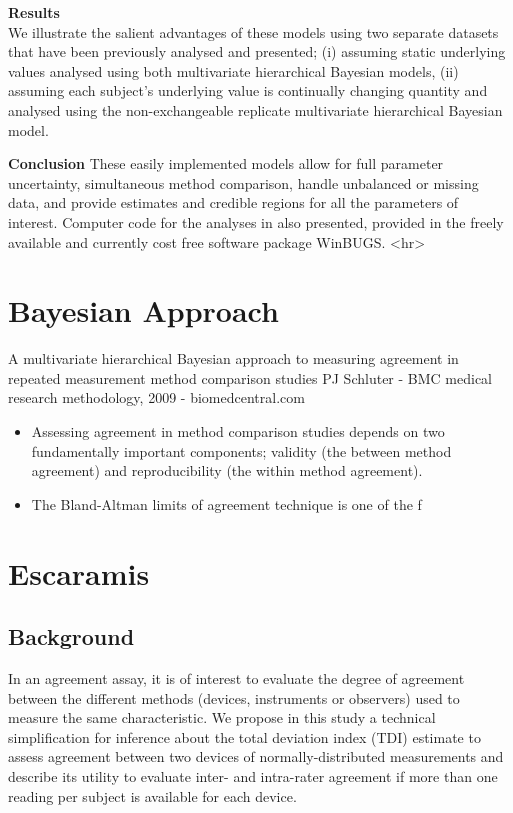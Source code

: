 \documentclass[12pt, a4paper]{report}
\theoremstyle{plain}
\theoremstyle{definition}
\theoremstyle{remark}
\begin{document}
\textbf{Results}\\
We illustrate the salient advantages of these models using two separate datasets that have been previously analysed and presented; 
(i) assuming static underlying values analysed using both multivariate hierarchical Bayesian models,  
(ii) assuming each subject's underlying value is continually changing quantity and analysed using the non-exchangeable replicate multivariate hierarchical Bayesian model.  

\textbf{Conclusion}
These easily implemented models allow for full parameter uncertainty, simultaneous method comparison, handle unbalanced or missing data, and provide estimates and credible regions for all the parameters of interest. Computer code for the analyses in also presented, provided in the freely available and currently cost free software package WinBUGS.
<hr>

\section*{Bayesian Approach}
A multivariate hierarchical Bayesian approach to measuring agreement in repeated measurement method comparison studies
PJ Schluter - BMC medical research methodology, 2009 - biomedcentral.com

\begin{itemize}
	\item Assessing agreement in method comparison studies depends on two fundamentally important 
	components; validity (the between method agreement) and reproducibility (the within method 
	agreement). 
	\item The Bland-Altman limits of agreement technique is one of the f
\end{itemize}

\section{Escaramis}
\subsection{Background}
In an agreement assay, it is of interest to evaluate the degree of agreement between the different methods (devices, instruments or observers) used to measure the same characteristic. We propose in this study a technical simplification for inference about the total deviation index (TDI) estimate to assess agreement between two devices of normally-distributed measurements and describe its utility to evaluate inter- and intra-rater agreement if more than one reading per subject is available for each device.
\end{document}

